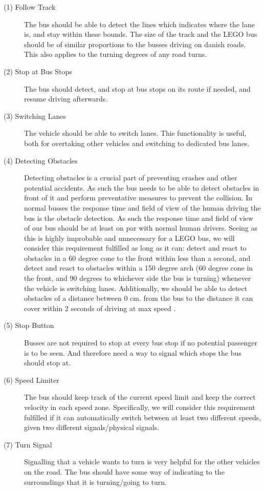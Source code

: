 \begin{description}
    \item [(1) Follow Track]
    The bus should be able to detect the lines which indicates where the lane is, and stay within these bounds. The size of the track and the LEGO bus should be of similar proportions to the busses driving on danish roads. This also applies to the turning degrees of any road turns. 
    
    \item[(2) Stop at Bus Stops]
    The bus should detect, and stop at bus stops on its route if needed, and resume driving afterwards. 

    \item[(3) Switching Lanes] 
    The vehicle should be able to switch lanes. This functionality is useful, both for overtaking other vehicles and switching to dedicated bus lanes. 
    
    \item[(4) Detecting Obstacles]
    Detecting obstacles is a crucial part of preventing crashes and other potential accidents. As such the bus needs to be able to detect obstacles in front of it and perform preventative measures to prevent the collision. In normal busses the response time and field of view of the human driving the bus is the obstacle detection. As such the response time and field of view of our bus should be at least on par with normal human drivers. Seeing as this is highly improbable and unnecessary for a LEGO bus, we will consider this requirement fulfilled as long as it can: detect and react to obstacles in a 60 degree cone to the front within less than a second, and detect and react to obstacles within a 150 degree arch (60 degree cone in the front, and 90 degrees to whichever side the bus is turning) whenever the vehicle is switching lanes. Additionally, we should be able to detect obstacles of a distance between 0 cm. from the bus to the distance it can cover within 2 seconds of driving at max speed \cite{holdAfstand}.

    \item[(5) Stop Button]
    Busses are not required to stop at every bus stop if no potential passenger is to be seen. And therefore need a way to signal which stops the bus should stop at. 
    
    \item[(6) Speed Limiter]
    The bus should keep track of the current speed limit and keep the correct velocity in each speed zone. Specifically, we will consider this requirement fulfilled if it can automatically switch between at least two different speeds, given two different signals/physical signals. 
    
    \item[(7) Turn Signal]
    Signalling that a vehicle wants to turn is very helpful for the other vehicles on the road. The bus should have some way of indicating to the surroundings that it is turning/going to turn.
\end{description}

